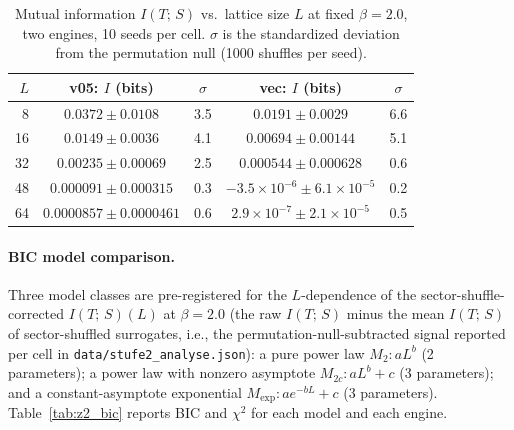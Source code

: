 \documentclass[aps,pra,twocolumn,superscriptaddress,showpacs,floatfix]{revtex4-2}
\newcommand{\MI}{I(T;\,S)}
\begin{document}
\begin{table}[b]
\caption{Mutual information $\MI$ vs.\ lattice size $L$ at fixed $\beta=2.0$,
two engines, 10 seeds per cell. $\sigma$ is the standardized deviation from
the permutation null (1000 shuffles per seed).}
\label{tab:z2_scaling}
\begin{ruledtabular}
\begin{tabular}{rcccc}
$L$ & v05: $I$ (bits) & $\sigma$ & vec: $I$ (bits) & $\sigma$ \\
\hline
 8 & $0.0372 \pm 0.0108$    & 3.5 & $0.0191 \pm 0.0029$     & 6.6 \\
16 & $0.0149 \pm 0.0036$    & 4.1 & $0.00694 \pm 0.00144$   & 5.1 \\
32 & $0.00235 \pm 0.00069$  & 2.5 & $0.000544 \pm 0.000628$ & 0.6 \\
48 & $0.000091 \pm 0.000315$ & 0.3 & $-3.5\!\times\!10^{-6} \pm 6.1\!\times\!10^{-5}$ & 0.2 \\
64 & $0.0000857 \pm 0.0000461$ & 0.6 & $2.9\!\times\!10^{-7} \pm 2.1\!\times\!10^{-5}$ & 0.5 \\
\end{tabular}
\end{ruledtabular}
\end{table}

\paragraph{BIC model comparison.}
Three model classes are pre-registered for the $L$-dependence of the
sector-shuffle-corrected $\MI(L)$ at $\beta=2.0$ (the raw $\MI$ minus the mean
$\MI$ of sector-shuffled surrogates, i.e., the permutation-null-subtracted
signal reported per cell in \texttt{data/stufe2\_analyse.json}): a pure power law
$M_2 : a L^{b}$ (2 parameters); a power law with nonzero asymptote
$M_{2c} : a L^{b} + c$ (3 parameters); and a constant-asymptote exponential
$M_\mathrm{exp} : a e^{-b L} + c$ (3 parameters). Table~\ref{tab:z2_bic}
reports BIC and $\chi^2$ for each model and each engine.
\end{document}
